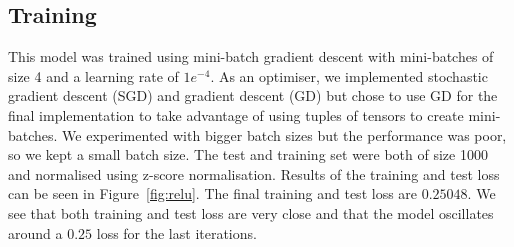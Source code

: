 \documentclass[10pt,conference,compsocconf]{IEEEtran}
\begin{document}
\subsection{Training}\label{subsec:training}

This model was trained using mini-batch gradient descent with mini-batches of size 4 and a learning rate of $1e^{-4}$. As an optimiser, we implemented stochastic gradient descent (SGD) and gradient descent (GD) but chose to use GD for the final implementation to take advantage of using tuples of tensors to create mini-batches. We experimented with bigger batch sizes but the performance was poor, so we kept a small batch size. The test and training set were both of size 1000 and normalised using z-score normalisation. Results of the training and test loss can be seen in Figure~\ref{fig:relu}. The final training and test loss are $0.25048$. We see that both training and test loss are very close and that the model oscillates around a $0.25$ loss for the last iterations. 
\end{document}
